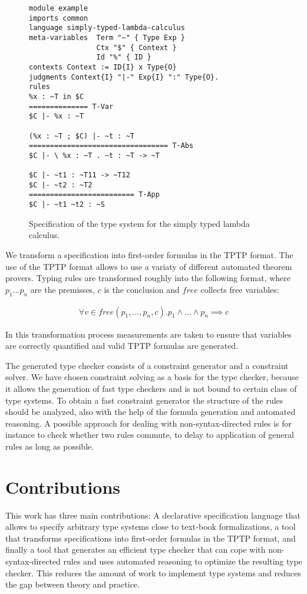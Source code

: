 \documentclass[preprint]{sigplanconf}
\begin{document}
\begin{figure}
\begin{verbatim}
module example
imports common
language simply-typed-lambda-calculus
meta-variables 	Term "~" { Type Exp }
                Ctx "$" { Context }
                Id "%" { ID }
contexts Context := ID{I} x Type{O}
judgments Context{I} "|-" Exp{I} ":" Type{O}.
rules
%x : ~T in $C
============== T-Var
$C |- %x : ~T

(%x : ~T ; $C) |- ~t : ~T
================================= T-Abs
$C |- \ %x : ~T . ~t : ~T -> ~T

$C |- ~t1 : ~T11 -> ~T12
$C |- ~t2 : ~T2
========================= T-App
$C |- ~t1 ~t2 : ~S
\end{verbatim}
\caption{Specification of the type system for the simply typed lambda
  calculus.}
\label{fig:example-specification}
\end{figure}

We transform a specification into first-order formulas in the TPTP
\cite{Sutcliffe04tstpdata-exchange} format. The use of the TPTP format
allows to use a variaty of different automated theorem provers. Typing
rules are transformed roughly into the following format, where $p_1
\dots p_n$ are the premisses, $c$ is the conclusion and $free$
collects free variables:

\begin{align}
  \forall v \in free(p_1, \dots, p_n, c) . p_1 \land \dots \land p_n \implies  c 
\end{align}

In this transformation process measurements are taken to ensure that
variables are correctly quantified and valid TPTP formulas are
generated.

The generated type checker consists of a constraint generator and a
constraint solver. We have chosen constraint solving as a basis for
the type checker, because it allows the generation of fast type
checkers and is not bound to certain class of type systems. To obtain
a fast constraint generator the structure of the rules should be
analyzed, also with the help of the formula generation and automated
reasoning. A possible approach for dealing with non-syntax-directed
rules is for instance to check whether two rules commute, to delay to
application of general rules as long as possible.
\section{Contributions}
This work has three main contributions: A declarative specification
language that allows to specify arbitrary type systems close to
text-book formalizations, a tool that transforms specifications into
first-order formulas in the TPTP format, and finally a tool that
generates an efficient type checker that can cope with
non-syntax-directed rules and uses automated reasoning to optimize the
resulting type checker. This reduces the amount of work to implement
type systems and reduces the gap between theory and practice.
\end{document}
